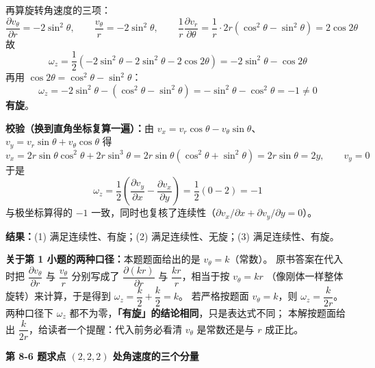 \begin{jie}
再算旋转角速度的三项：
\[ \frac{\partial v_\theta}{\partial r}=-2\sin^2\theta,\qquad
   \frac{v_\theta}{r}=-2\sin^2\theta,\qquad
   \frac{1}{r}\frac{\partial v_r}{\partial\theta}
   =\frac{1}{r}\cdot 2r\left(\cos^2\theta-\sin^2\theta\right)=2\cos2\theta \]
故
\[ \omega_z=\frac{1}{2}\left(-2\sin^2\theta-2\sin^2\theta-2\cos2\theta\right)=-2\sin^2\theta-\cos2\theta \]
再用 $\cos2\theta=\cos^2\theta-\sin^2\theta$：
\[ \omega_z=-2\sin^2\theta-\left(\cos^2\theta-\sin^2\theta\right)
 =-\sin^2\theta-\cos^2\theta=-1\neq0 \]
\textbf{有旋}。

\textbf{校验（换到直角坐标复算一遍）：}由 $v_x=v_r\cos\theta-v_\theta\sin\theta$、
$v_y=v_r\sin\theta+v_\theta\cos\theta$ 得
\[ v_x=2r\sin\theta\cos^2\theta+2r\sin^3\theta
 =2r\sin\theta\left(\cos^2\theta+\sin^2\theta\right)=2r\sin\theta=2y,\qquad v_y=0 \]
于是
\[ \omega_z=\frac{1}{2}\left(\frac{\partial v_y}{\partial x}-\frac{\partial v_x}{\partial y}\right)
 =\frac{1}{2}\left(0-2\right)=-1 \]
与极坐标算得的 $-1$ 一致，同时也复核了连续性（$\partial v_x/\partial x+\partial v_y/\partial y=0$）。

\textbf{结果：}(1) 满足连续性、有旋；(2) 满足连续性、无旋；(3) 满足连续性、有旋。
\end{jie}

\begin{tishi}
\textbf{关于第 1 小题的两种口径：}本题题面给出的是 $v_\theta=k$（常数）。
原书答案在代入时把 $\dfrac{\partial v_\theta}{\partial r}$ 与 $\dfrac{v_\theta}{r}$
分别写成了 $\dfrac{\partial(kr)}{\partial r}$ 与 $\dfrac{kr}{r}$，相当于按 $v_\theta=kr$
（像刚体一样整体旋转）来计算，于是得到 $\omega_z=\dfrac{k}{2}+\dfrac{k}{2}=k$。
若严格按题面 $v_\theta=k$，则 $\omega_z=\dfrac{k}{2r}$。
两种口径下 $\omega_z$ 都不为零，\textbf{「有旋」的结论相同}，只是表达式不同；
本解按题面给出 $\dfrac{k}{2r}$，给读者一个提醒：代入前务必看清 $v_\theta$ 是常数还是与 $r$ 成正比。
\end{tishi}

\noindent\textbf{第 8-6 题\quad 求点 $(2,2,2)$ 处角速度的三个分量}

